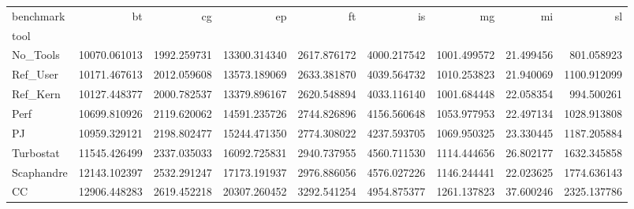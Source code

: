 \begin{tabular}{lrrrrrrrr}
\toprule
benchmark & bt & cg & ep & ft & is & mg & mi & sl \\
tool &  &  &  &  &  &  &  &  \\
\midrule
No_Tools & 10070.061013 & 1992.259731 & 13300.314340 & 2617.876172 & 4000.217542 & 1001.499572 & 21.499456 & 801.058923 \\
Ref_User & 10171.467613 & 2012.059608 & 13573.189069 & 2633.381870 & 4039.564732 & 1010.253823 & 21.940069 & 1100.912099 \\
Ref_Kern & 10127.448377 & 2000.782537 & 13379.896167 & 2620.548894 & 4033.116140 & 1001.684448 & 22.058354 & 994.500261 \\
Perf & 10699.810926 & 2119.620062 & 14591.235726 & 2744.826896 & 4156.560648 & 1053.977953 & 22.497134 & 1028.913808 \\
PJ & 10959.329121 & 2198.802477 & 15244.471350 & 2774.308022 & 4237.593705 & 1069.950325 & 23.330445 & 1187.205884 \\
Turbostat & 11545.426499 & 2337.035033 & 16092.725831 & 2940.737955 & 4560.711530 & 1114.444656 & 26.802177 & 1632.345858 \\
Scaphandre & 12143.102397 & 2532.291247 & 17173.191937 & 2976.886056 & 4576.027226 & 1146.244441 & 22.023625 & 1774.636143 \\
CC & 12906.448283 & 2619.452218 & 20307.260452 & 3292.541254 & 4954.875377 & 1261.137823 & 37.600246 & 2325.137786 \\
\bottomrule
\end{tabular}
